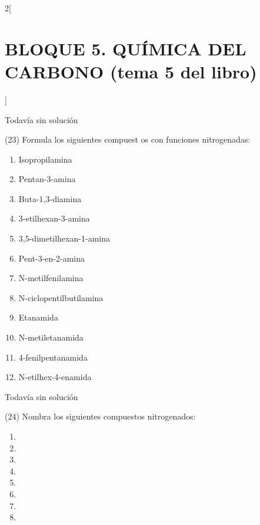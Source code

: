 \documentclass[10pt]{article}
\begin{document}
\begin{multicols}{2}[
  \section{BLOQUE 5. QUÍMICA DEL CARBONO (tema 5 del libro)}
  ]
\begin{solution}[print=false]
  Todavía sin solución
\end{solution}




\begin{exercise}[
    tags    = {},
    topics  = {química,química básica},
    source  = {FQ 1B MGH 2016, p85, e26},
  ]

  (23) Formula los siguientes compuest os con funciones nitrogenadas:
  \begin{enumerate}
    \item Isopropilamina
    \item Pentan-3-amina
    \item Buta-1,3-diamina
    \item 3-etilhexan-3-amina
    \item 3,5-dimetilhexan-1-amina
    \item Pent-3-en-2-amina
    \item N-metilfenilamina
    \item N-ciclopentilbutilamina
    \item Etanamida
    \item N-metiletanamida
    \item 4-fenilpentanamida
    \item N-etilhex-4-enamida
  \end{enumerate}
\end{exercise}

\begin{solution}[print=false]
  Todavía sin solución
\end{solution}




\begin{exercise}[
    tags    = {},
    topics  = {química,química básica},
    source  = {FQ 1B MGH 2016, p85, e26},
  ]

  (24) Nombra los siguientes compuestos nitrogenados:
  \begin{enumerate}
    \item {}
    \item {}
    \item {}
    \item {}
    \item {}
    \item {}
    \item {}
    \item {}
  \end{enumerate}
\end{exercise}


\end{multicols}
\end{document}
